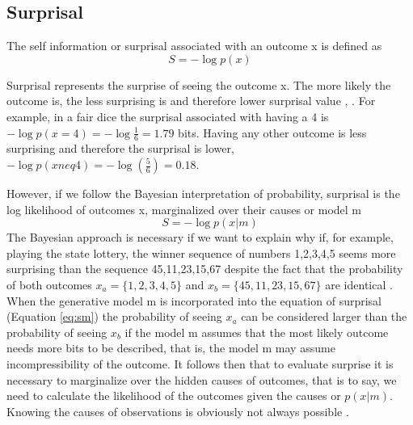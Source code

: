 \documentclass[11pt, onecolumn]{article}
\begin{document}
\subsection{Surprisal}
The self information or surprisal associated with an outcome x is defined as 
\begin{equation}
S = -\log p(x)
\label{eq:s}
\end{equation}

Surprisal represents  the surprise of seeing the outcome x. The more likely the outcome is, the less surprising is and therefore lower surprisal value \cite{tribus_thermostatics_1961},  \cite{barto_novelty_2013}. For example, in a fair dice the surprisal associated with having a 4 is $-\log p(x =4) = -\log \frac{1}{6} =1.79$ bits. Having any other outcome is less surprising and therefore the surprisal is lower, $-\log p(x neq 4) = -\log (\frac{5}{6}) =0.18$.

However, if we follow the Bayesian interpretation of probability, surprisal is the log likelihood of outcomes x,  marginalized over their causes or model m
\begin{equation}
S = -\log p(x|m)
\label{eq:sm}
\end{equation}
The Bayesian approach is necessary if we want to explain why if, for example, playing the state lottery, the winner sequence of numbers 1,2,3,4,5 seems more surprising than the sequence 45,11,23,15,67 despite the fact that the probability of both outcomes $x_a=\{1,2,3,4,5\}$ and $x_b=\{45,11,23,15,67\}$ are identical \cite{palm_novelty_2012}. When the generative model m is incorporated into the equation of surprisal (Equation \ref{eq:sm}) the probability of seeing $x_a$ can be considered larger than  the probability of seeing $x_b$ if the model m assumes that the most likely outcome needs more bits to be described, that is, the model m may assume incompressibility of the outcome. It follows then that to evaluate surprise it is necessary to marginalize over the hidden causes of outcomes, that is to say, we need to calculate the likelihood of the outcomes given the causes or $p(x|m)$. Knowing the causes of observations is obviously not always possible \citep{gomez-ramirez_dont_2013}. 
\end{document}
